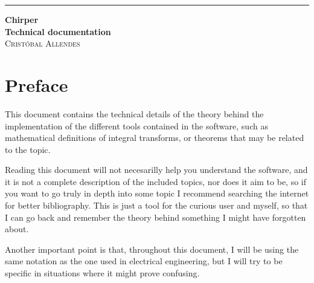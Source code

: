\documentclass[12pt]{article}
\begin{document}

\begin{titlepage}
	\raggedleft

	\rule{1pt}{\textheight}
	\hspace{0.05\textwidth}
	\parbox[b]{0.75\textwidth}{
		{\Huge\bfseries Chirper\\[2\baselineskip]
		{\large Technical documentation}}\\[\baselineskip]
		{\Large\textsc{Cristóbal Allendes}}\\[\baselineskip] 
		
		\vspace{0.6\textheight}
	}

\end{titlepage}

\section*{Preface}
This document contains the technical details of the theory behind the implementation of the different tools contained in the software, such as mathematical definitions of integral transforms, or theorems that may be related to the topic.

Reading this document will not necesarilly help you understand the software, and it is not a complete description of the included topics, nor does it aim to be, so if you want to go truly in depth into some topic I recommend searching the internet for better bibliography. This is just a tool for the curious user and myself, so that I can go back and remember the theory behind something I might have forgotten about.

Another important point is that, throughout this document, I will be using the same notation as the one used in electrical engineering, but I will try to be specific in situations where it might prove confusing.

\newpage
\tableofcontents


\newpage

\end{document}
